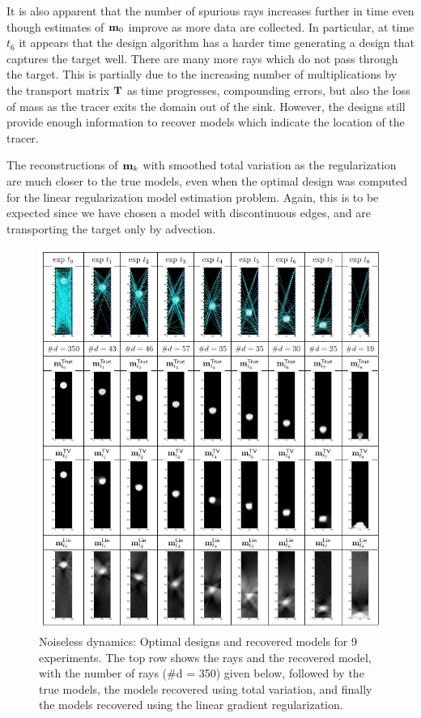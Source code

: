 \documentclass[leqno,onefignum,onetabnum]{siamltexmm}
\newcommand{\bfT}	{{\bf{T}}}
\newcommand{\bfm}	{{\bf{m}}}
\begin{document}
It is also apparent that the number of spurious rays increases further in time even though estimates of $\bfm_0$ improve as more data are collected. In particular, at time $t_6$ it appears that the design algorithm has a harder time generating a design that captures the target well. There are many more rays which do not pass through the target. This is partially due to the increasing number of multiplications by the transport matrix $\bfT$ as time progresses, compounding errors, but also the loss of mass as the tracer exits the domain out of the sink. However, the designs still provide enough information to recover models which indicate the location of the tracer.  

The reconstructions of $\bfm_k$ with smoothed total variation as the regularization are much closer to the true models, even when the optimal design was computed for the linear regularization model estimation problem. Again, this is to be expected since we have chosen a model with discontinuous edges, and are transporting the target only by advection. 
\begin{figure}[!h]
	\begin{center}
	\iwidth=150mm
	\includegraphics[width = 1\iwidth]{figures/newFigs/resultsAll1}
	\end{center}
	\caption{Noiseless dynamics: Optimal designs and recovered models for 9 	experiments. The top row shows the rays and the recovered model, with 		the number of rays (\#d = 350) given below, followed by the true 			models, the models recovered using total variation, and finally the 		models recovered using the linear gradient regularization.}
	\label{fig:results1}
\end{figure}
\end{document}
